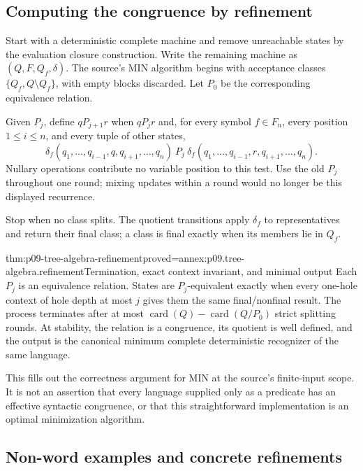 \subsection{Computing the congruence by refinement}
\label{sec:p09-tree-algebra-refinement}

Start with a deterministic complete machine and remove unreachable states
by the evaluation closure construction. Write the remaining machine as
\((Q,F,Q_f,\delta)\).
The source's MIN algorithm begins with acceptance classes
\(\{Q_f,Q\setminus Q_f\}\), with empty blocks discarded.
Let \(P_0\) be the corresponding equivalence relation.

Given \(P_j\), define \(qP_{j+1}r\) when \(qP_jr\) and, for every
symbol \(f\in F_n\), every position \(1\leq i\leq n\), and every
tuple of other states,
\[
 \delta_f(q_1,\ldots,q_{i-1},q,q_{i+1},\ldots,q_n)
 \ P_j\
 \delta_f(q_1,\ldots,q_{i-1},r,q_{i+1},\ldots,q_n).
\]
Nullary operations contribute no variable position to this test.
Use the old \(P_j\) throughout one round; mixing updates within a round
would no longer be this displayed recurrence.

Stop when no class splits. The quotient transitions apply \(\delta_f\)
to representatives and return their final class; a class is final
exactly when its members lie in \(Q_f\).

\begin{hbtheorem}{thm:p09-tree-algebra-refinement}{proved=annex:p09.tree-algebra.refinement}{Termination, exact context invariant, and minimal output}
Each \(P_j\) is an equivalence relation. States are \(P_j\)-equivalent
exactly when every one-hole context of hole depth at most \(j\)
gives them the same final/nonfinal result.
The process terminates after at most
\(\operatorname{card}(Q)-\operatorname{card}(Q/P_0)\) strict splitting
rounds. At stability, the relation is a congruence, its quotient is
well defined, and the output is the canonical minimum complete
deterministic recognizer of the same language.
\end{hbtheorem}

This fills out the correctness argument for MIN at the source's
finite-input scope. It is not an assertion that every language supplied
only as a predicate has an effective syntactic congruence, or that this
straightforward implementation is an optimal minimization algorithm.

\subsection{Non-word examples and concrete refinements}
\label{sec:p09-tree-algebra-examples}

